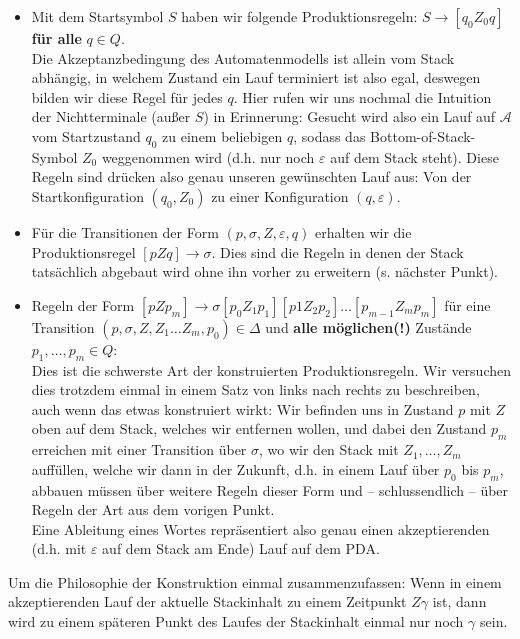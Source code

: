 \documentclass[11pt, a4paper]{article}
\theoremstyle{definition}
\theoremstyle{plain}
\begin{document}
\begin{itemize}
	\item Mit dem Startsymbol \( S \) haben wir folgende Produktionsregeln: \( S \to [q_0 Z_0 q] \) \textbf{für alle} \( q \in Q \).\\
	Die Akzeptanzbedingung des Automatenmodells ist allein vom Stack abhängig, in welchem Zustand ein Lauf terminiert ist also egal, deswegen bilden wir diese Regel für jedes \( q \). Hier rufen wir uns nochmal die Intuition der Nichtterminale (außer \( S \)) in Erinnerung: Gesucht wird also ein Lauf auf \( \mathcal{A} \) vom Startzustand \( q_0 \) zu einem beliebigen \( q \), sodass das Bottom-of-Stack-Symbol \( Z_0 \) weggenommen wird (d.h. nur noch \( \varepsilon \) auf dem Stack steht). Diese Regeln sind drücken also genau unseren gewünschten Lauf aus: Von der Startkonfiguration \( (q_0, Z_0) \) zu einer Konfiguration \( (q, \varepsilon) \).
	\item Für die Transitionen der Form \( (p, \sigma, Z, \varepsilon, q) \) erhalten wir die Produktionsregel \( [pZq] \to \sigma \). Dies sind die Regeln in denen der Stack tatsächlich abgebaut wird ohne ihn vorher zu erweitern (s. nächster Punkt).
	\item Regeln der Form \( [pZp_m] \to \sigma [p_0 Z_1 p_1][p1 Z_2 p_2] \ldots [p_{m-1} Z_m p_m] \) für eine Transition \( (p, \sigma, Z, Z_1 \ldots Z_m, p_0) \in \Delta \) und \textbf{alle möglichen(!)} Zustände \( p_1, \ldots, p_m \in Q \):\\
	Dies ist die schwerste Art der konstruierten Produktionsregeln. Wir versuchen dies trotzdem einmal in einem Satz von links nach rechts zu beschreiben, auch wenn das etwas konstruiert wirkt:
	Wir befinden uns in Zustand \( p \) mit \( Z \) oben auf dem Stack, welches wir entfernen wollen, und dabei den Zustand \( p_m \) erreichen mit einer Transition über \( \sigma \), wo wir den Stack mit \( Z_1, \ldots, Z_m \) auffüllen, welche wir dann in der Zukunft, d.h. in einem Lauf über \( p_0 \) bis \( p_m \), abbauen müssen über weitere Regeln dieser Form und -- schlussendlich -- über Regeln der Art aus dem vorigen Punkt.\\
	Eine Ableitung eines Wortes repräsentiert also genau einen akzeptierenden (d.h. mit \( \varepsilon \) auf dem Stack am Ende) Lauf auf dem PDA.
\end{itemize}
Um die Philosophie der Konstruktion einmal zusammenzufassen: Wenn in einem akzeptierenden Lauf der aktuelle Stackinhalt zu einem Zeitpunkt \( Z\gamma \) ist, dann wird zu einem späteren Punkt des Laufes der Stackinhalt einmal nur noch \( \gamma \) sein.\\
\end{document}
